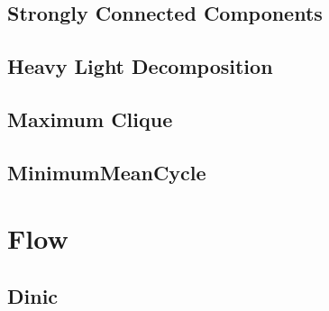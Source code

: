 \documentclass[a4paper,10pt,twocolumn,oneside]{article}
\begin{document}
\subsection{Strongly Connected Components}


\subsection{Heavy Light Decomposition}


%

%

%

\subsection{Maximum Clique}


\subsection{MinimumMeanCycle}


\section{Flow}
%

\subsection{Dinic} %

\end{document}
